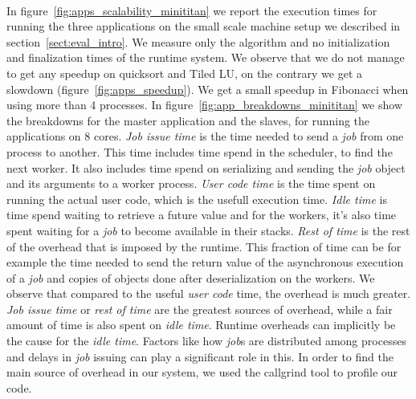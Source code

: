 \paragraph{}
	In figure~\ref{fig:apps_scalability_minititan} we report the execution times for running the three applications on the
small scale machine setup we described in section~\ref{sect:eval_intro}.  We measure only the algorithm and no initialization
and finalization times of the runtime system.
We observe that we do not manage to get any speedup 
on quicksort and Tiled LU, on the contrary we get a slowdown (figure~\ref{fig:apps_speedup}).
We get a small speedup in Fibonacci when using more than 4 processes.  
In figure~\ref{fig:app_breakdowns_minititan} 
we show the breakdowns for the master application and the slaves, for running the applications on 8 cores.
\emph{Job issue time} is the time needed to send a \emph{job} from one process to another. This time includes
time spend in the scheduler, to find the next worker.  It also includes time spend on serializing and sending 
the \emph{job} object and its arguments to a worker process.  \emph{User code time} is the time spent on 
running the actual user code, which is the usefull execution time.  
\emph{Idle time} is time spend waiting to retrieve a future 
value and for the workers, it's also time spent waiting for a \emph{job} to become available in their stacks.
\emph{Rest of time} is the rest of the overhead that is imposed by the runtime.  This fraction of time can be for 
example the time needed to send the return value of the asynchronous execution of a \emph{job} and copies
of objects done after deserialization on the workers.
We observe that compared to the useful \emph{user code} time, the overhead is much greater.
\emph{Job issue time} or \emph{rest of time} are the greatest sources of 
overhead, while a fair amount of time is also spent on \emph{idle time}.  Runtime overheads can 
implicitly be the cause for the \emph{idle time}.  Factors like how \emph{job}s
are distributed among processes and delays in \emph{job} issuing can play a significant role in this.
In order to find the main source of overhead in our system, we used the callgrind tool
to profile our code.  

